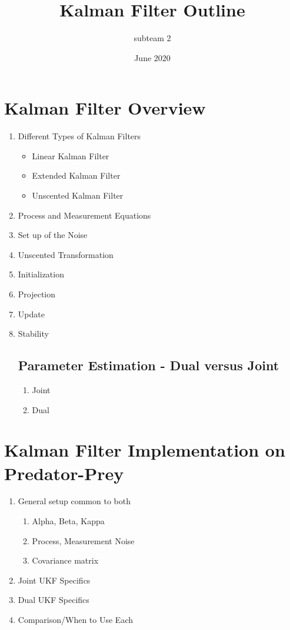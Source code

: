 \documentclass{article}
\title{Kalman Filter Outline}
\author{subteam 2}
\date{June 2020}
\begin{document}
\maketitle

\section{Kalman Filter Overview}
\begin{enumerate}
    \item Different Types of Kalman Filters
    \begin{itemize}
        \item Linear Kalman Filter
        \item Extended Kalman Filter
        \item Unscented Kalman Filter
    \end{itemize}
    \item Process and Measurement Equations
    \item Set up of the Noise
    \item Unscented Transformation
    \item Initialization
    \item Projection
    \item Update
    \item Stability
\subsection{Parameter Estimation - Dual versus Joint}
\begin{enumerate}
    \item Joint
    \item Dual
    
\end{enumerate}
\end{enumerate}
\section{Kalman Filter Implementation on Predator-Prey}
\begin{enumerate}
    \item General setup common to both
    \begin{enumerate}
        \item Alpha, Beta, Kappa
        \item Process, Measurement Noise
        \item Covariance matrix
    \end{enumerate}
    \item Joint UKF Specifics
    \item Dual UKF Specifics
    \item Comparison/When to Use Each
\end{enumerate}
\end{document}
